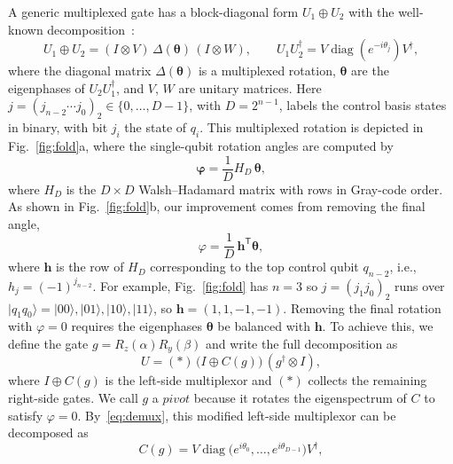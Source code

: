 \documentclass[11pt]{article}
\begin{document}
A generic multiplexed gate has a block-diagonal form $U_1\oplus U_2$ with the well-known decomposition~\cite{smb}:
\begin{equation}\label{eq:demux}
U_1\oplus U_2=(I\otimes V)\,\Delta(\boldsymbol\theta)\,(I\otimes W),\qquad
U_1U_2^\dagger=V\operatorname{diag}(e^{-i\theta_j})V^\dagger ,
\end{equation}
where the diagonal matrix $\Delta(\boldsymbol\theta)$ is a multiplexed rotation, $\boldsymbol\theta$ are the eigenphases of $U_2U_1^\dagger$, and $V$, $W$ are unitary matrices. Here $j=(j_{n-2}\cdots j_0)_2\in\{0,\dots,D-1\}$, with $D=2^{n-1}$, labels the control basis states in binary, with bit $j_i$ the state of $q_i$. This multiplexed rotation is depicted in Fig.~\ref{fig:fold}a, where the single-qubit rotation angles are computed by~\cite{mottonen}
\begin{equation}\label{eq:walsh}
\boldsymbol\varphi=\frac1D H_D\,\boldsymbol\theta,
\end{equation}
where $H_D$ is the $D\times D$ Walsh--Hadamard matrix with rows in Gray-code order. As shown in Fig.~\ref{fig:fold}b, our improvement comes from removing the final angle,
\begin{equation}\label{eq:phi}
\varphi=\frac1D\,\mathbf h^{\mathsf T}\boldsymbol\theta,
\end{equation}
where $\mathbf h$ is the row of $H_D$ corresponding to the top control qubit $q_{n-2}$, i.e., $h_j=(-1)^{j_{n-2}}$. 
For example, Fig.~\ref{fig:fold} has $n=3$ so $j=(j_1j_0)_2$ runs over $\lvert q_1q_0\rangle=\lvert00\rangle,\lvert01\rangle,\lvert10\rangle,\lvert11\rangle$, so $\mathbf h=(1,1,-1,-1)$. Removing the final rotation with $\varphi=0$ requires the eigenphases $\boldsymbol\theta$ be balanced with $\mathbf h$. To achieve this, we define the gate $g=R_z(\alpha)R_y(\beta)$ and write the full decomposition as
\begin{equation}\label{eq:zxz}
U=(\ast)\,\big(I\oplus C(g)\big)\,(g^\dagger\otimes I),
\end{equation}
where $I\oplus C(g)$ is the left-side multiplexor and $(\ast)$ collects the remaining right-side
gates. We call $g$ a $\textit{pivot}$ because it rotates the eigenspectrum of $C$ to satisfy $\varphi=0$. By~\eqref{eq:demux}, this modified left-side multiplexor can be decomposed as
\begin{equation}\label{eq:democ}
C(g)=V\operatorname{diag}\big(e^{i\theta_0},\dots,e^{i\theta_{D-1}}\big)V^\dagger ,
\end{equation}
\end{document}

